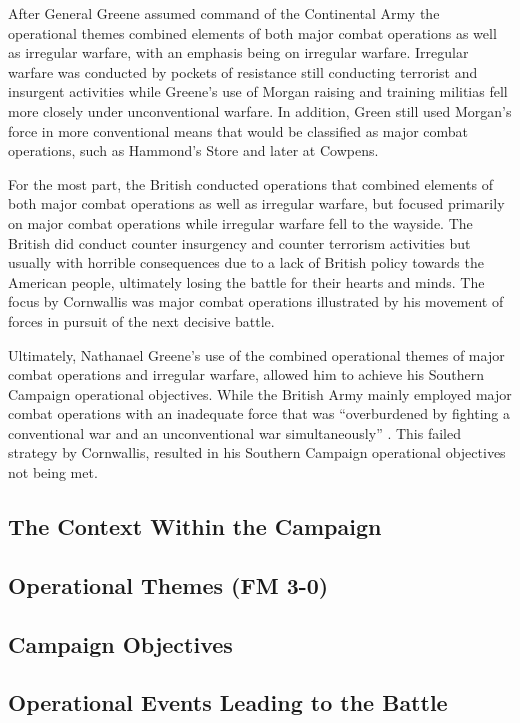 After General Greene assumed command of the Continental Army the operational
themes combined elements of both major combat operations as well as irregular
warfare, with an emphasis being on irregular warfare.  Irregular warfare was
conducted by pockets of resistance still conducting terrorist and insurgent
activities while Greene's use of Morgan raising and training militias fell more
closely under unconventional warfare.  In addition, Green still used Morgan's
force in more conventional means that would be classified as major combat
operations, such as Hammond's Store and later at Cowpens.

For the most part, the British conducted operations that combined elements of
both major combat operations as well as irregular warfare, but focused
primarily on major combat operations while irregular warfare fell to the
wayside.  The British did conduct counter insurgency and counter terrorism
activities but usually with horrible consequences due to a lack of British
policy towards the American people, ultimately losing the battle for their
hearts and minds.  The focus by Cornwallis was major combat operations
illustrated by his movement of forces in pursuit of the next decisive battle.  

Ultimately, Nathanael Greene's use of the combined operational themes of major
combat operations and irregular warfare, allowed him to achieve his Southern
Campaign operational objectives.  While the British Army mainly employed major
combat operations with an inadequate force that was ``overburdened by fighting
a conventional war and an unconventional war simultaneously''
\cite[55]{woodward_comparative_2002}.  This failed strategy by Cornwallis,
resulted in his Southern Campaign operational objectives not being met.


\subsection{The Context Within the Campaign}

\subsection{Operational Themes (FM 3-0)}

\subsection{Campaign Objectives}

\subsection{Operational Events Leading to the Battle}





